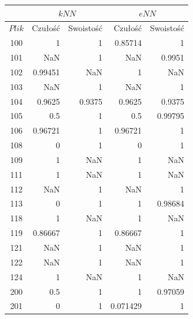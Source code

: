 \begin{table}[H]
	\centering
	\begin{tabular}{|c|r|r|r|r|}
		\hline
		& \multicolumn{2}{c|}{$kNN$} & \multicolumn{2}{c|}{$eNN$} \\
		\hline
		$Plik$ & Czułość & Swoistość & Czułość & Swoistość \\
		\hline
100 &1 &1 &0.85714 &1\\                  
\hline                                   
101 &NaN &1 &NaN &0.9951\\               
\hline                                   
102 &0.99451 &NaN &1 &NaN\\              
\hline                                   
103 &NaN &1 &NaN &1\\                    
\hline                                   
104 &0.9625 &0.9375 &0.9625 &0.9375\\    
\hline                                   
105 &0.5 &1 &0.5 &0.99795\\              
\hline                                   
106 &0.96721 &1 &0.96721 &1\\            
\hline                                   
108 &0 &1 &0 &1\\                        
\hline                                   
109 &1 &NaN &1 &NaN\\                    
\hline                                   
111 &1 &NaN &1 &NaN\\                    
\hline                                   
112 &NaN &1 &NaN &1\\                    
\hline                                   
113 &0 &1 &1 &0.98684\\                  
\hline                                   
118 &1 &NaN &1 &NaN\\                    
\hline                                   
119 &0.86667 &1 &0.86667 &1\\            
\hline                                   
121 &NaN &1 &NaN &1\\                    
\hline                                   
122 &NaN &1 &NaN &1\\                    
\hline                                   
124 &1 &NaN &1 &NaN\\                    
\hline                                   
200 &0.5 &1 &1 &0.97059\\                
\hline                                   
201 &0 &1 &0.071429 &1\\                 

\end{tabular}
\end{table}
